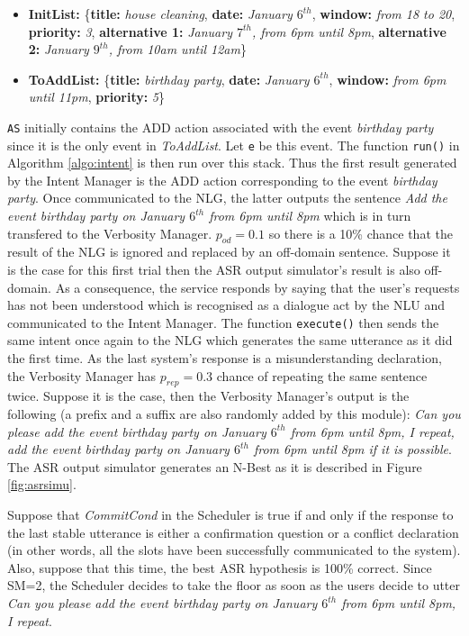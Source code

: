 				\begin{itemize}
					\item \textbf{InitList:} \{\textbf{title:} \textit{house cleaning}, \textbf{date:} \textit{January $6^{th}$}, \textbf{window:} \textit{from 18 to 20}, \textbf{priority:} \textit{3}, \textbf{alternative 1:} \textit{January $7^{th}$, from 6pm until 8pm}, \textbf{alternative 2:} \textit{January $9^{th}$, from 10am until 12am}\}
					\item \textbf{ToAddList:} \{\textbf{title:} \textit{birthday party}, \textbf{date:} \textit{January $6^{th}$}, \textbf{window:} \textit{from 6pm until 11pm}, \textbf{priority:} \textit{5}\}
				\end{itemize}
				
				\texttt{AS} initially contains the ADD action associated with the event \textit{birthday party} since it is the only event in \textit{ToAddList}. Let \texttt{e} be this event. The function \texttt{run()} in Algorithm \ref{algo:intent} is then run over this stack. Thus the first result generated by the Intent Manager is the ADD action corresponding to the event \textit{birthday party}. Once communicated to the NLG, the latter outputs the sentence \textit{Add the event birthday party on January $6^{th}$ from 6pm until 8pm} which is in turn transfered to the Verbosity Manager. $p_{od}=0.1$ so there is a 10\% chance that the result of the NLG is ignored and replaced by an off-domain sentence. Suppose it is the case for this first trial then the ASR output simulator's result is also off-domain. As a consequence, the service responds by saying that the user's requests has not been understood which is recognised as a dialogue act by the NLU and communicated to the Intent Manager. The function \texttt{execute()} then sends the same intent once again to the NLG which generates the same utterance as it did the first time. As the last system's response is a misunderstanding declaration, the Verbosity Manager has $p_{rep}=0.3$ chance of repeating the same sentence twice. Suppose it is the case, then the Verbosity Manager's output is the following (a prefix and a suffix are also randomly added by this module): \textit{Can you please add the event birthday party on January $6^{th}$ from 6pm until 8pm, I repeat, add the event birthday party on January $6^{th}$ from 6pm until 8pm if it is possible}. The ASR output simulator generates an N-Best as it is described in Figure \ref{fig:asrsimu}.
				
				Suppose that \textit{CommitCond} in the Scheduler is true if and only if the response to the last stable utterance is either a confirmation question or a conflict declaration (in other words, all the slots have been successfully communicated to the system). Also, suppose that this time, the best ASR hypothesis is 100\% correct. Since SM=2, the Scheduler decides to take the floor as soon as the users decide to utter \textit{Can you please add the event birthday party on January $6^{th}$ from 6pm until 8pm, I repeat}.
				
